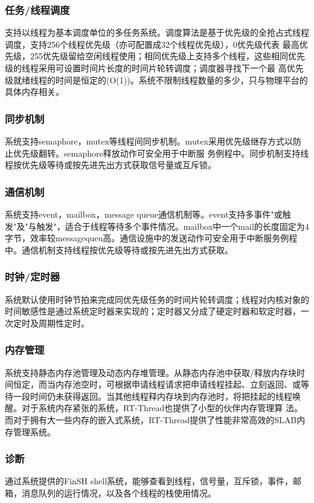 \subsubsection{任务/线程调度}
支持以线程为基本调度单位的多任务系统。调度算法是基于优先级的全抢占式线程调度，支持256个线程优先级（亦可配置成32个线程优先级），0优先级代表 最高优先级，255优先级留给空闲线程使用；相同优先级上支持多个线程，这些相同优先级的线程采用可设置时间片长度的时间片轮转调度；调度器寻找下一个最 高优先级就绪线程的时间是恒定的(O(1))。系统不限制线程数量的多少，只与物理平台的具体内存相关。

\subsubsection{同步机制}
系统支持semaphore，mutex等线程间同步机制。mutex采用优先级继存方式以防止优先级翻转。semaphore释放动作可安全用于中断服 务例程中。同步机制支持线程按优先级等待或按先进先出方式获取信号量或互斥锁。

\subsubsection{通信机制}
系统支持event，mailbox，message queue通信机制等。event支持多事件"或触发"及"与触发"，适合于线程等待多个事件情况。mailbox中一个mail的长度固定为4字节，效率较messagequeu高。通信设施中的发送动作可安全用于中断服务例程中。通信机制支持线程按优先级等待或按先进先出方式获取。

\subsubsection{时钟/定时器}
系统默认使用时钟节拍来完成同优先级任务的时间片轮转调度；线程对内核对象的时间敏感性是通过系统定时器来实现的；定时器又分成了硬定时器和软定时器，一 次定时及周期性定时。

\subsubsection{内存管理}
系统支持静态内存池管理及动态内存堆管理。从静态内存池中获取/释放内存块时间恒定，而当内存池空时，可根据申请线程请求把申请线程挂起、立刻返回、或等 待一段时间仍未获得返回。当其他线程释内存块到内存池时，将把挂起的线程唤醒。对于系统内存紧张的系统，RT-Thread也提供了小型的伙伴内存管理算 法。而对于拥有大一些内存的嵌入式系统，RT-Thread提供了性能非常高效的SLAB内存管理系统。

\subsubsection{诊断}
通过系统提供的FinSH shell系统，能够查看到线程，信号量，互斥锁，事件，邮箱，消息队列的运行情况，以及各个线程的栈使用情况。

